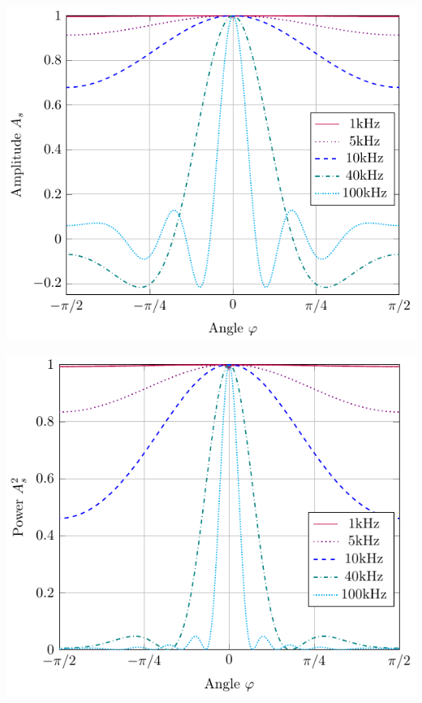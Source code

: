 \begin{center}
    \begin{minipage}{.49\textwidth}
        \includegraphics[width=\textwidth]{images/2_Preliminaries/Single_Slid_Frequency.pdf}
    \end{minipage}
    \begin{minipage}{.49\textwidth}
        \includegraphics[width=\textwidth]{images/2_Preliminaries/Single_Slid_Frequency_Power.pdf}
    \end{minipage}
\end{center}
